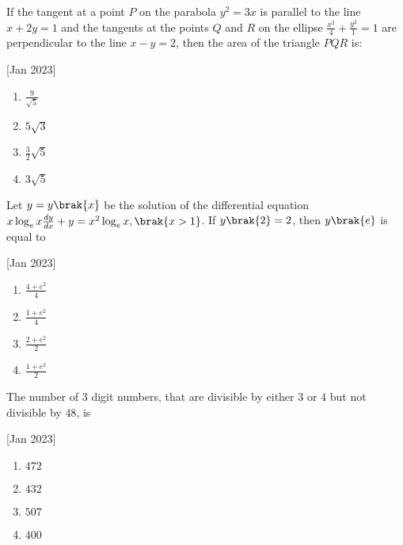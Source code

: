 \iffalse
	\title{2023}
	\author{AI24BTECH11003}
	\section{mcq-single}
\fi

    \item If the tangent at a point $P$ on the parabola $y^2 = 3x$ is parallel to the line $x+2y=1$ and the tangents at the points $Q$ and $R$ on the ellipse $\frac{x^2}{4}+\frac{y^2}{1}=1$ are perpendicular to the line $x-y=2$, then the area of the triangle $PQR$ is:
    
    \hfill[Jan 2023]

        \begin{multicols}{4}
            \begin{enumerate}
                \item $\frac{9}{\sqrt{5}}$
                \item $5\sqrt{3}$
                \item $\frac{3}{2}\sqrt{5}$
                \item $3\sqrt{5}$
            \end{enumerate}
        \end{multicols}

    \item Let $y=y\brak{x}$ be the solution of the differential equation $x\log_ex\frac{dy}{dx}+y=x^2\log_ex,\brak{x>1}$. If $y\brak{2}=2$, then $y\brak{e}$ is equal to
    
    \hfill[Jan 2023]

		\begin{multicols}{4}
			\begin{enumerate}
				\item $\frac{4+e^2}{4}$
				\item $\frac{1+e^2}{4}$
				\item $\frac{2+e^2}{2}$
				\item $\frac{1+e^2}{2}$
			\end{enumerate}
		\end{multicols}

    \item The number of $3$ digit numbers, that are divisible by either $3$ or $4$ but not divisible by $48$, is
    
    \hfill[Jan 2023]

        \begin{multicols}{4}
            \begin{enumerate}
                \item $472$
                \item $432$
                \item $507$
                \item $400$
            \end{enumerate}
        \end{multicols}

